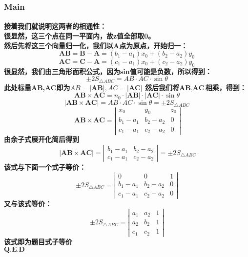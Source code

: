 \documentclass[final,11pt,oneside,UTF8]{article}
\begin{document}
\subsubsection{Main}
\paragraph{
    接着我们就说明这两者的相通性：\\
    很显然，这三个点在同一平面内，故z值全部取0。\\
    然后先将这三个向量归一化，我们以A点为原点，开始归一：\\
    $$\textbf{AB}=\textbf{B}-\textbf{A}=(b_1-a_1)x_0+(b_2-a_2)y_0$$
    $$\textbf{AC}=\textbf{C}-\textbf{A}=(c_1-a_1)x_0+(c_2-a_2)y_0$$
    很显然，我们由三角形面积公式，因为sin值可能是负数，所以得到：\\
    $$\pm 2S_{\triangle ABC}=AB \cdot AC \cdot \sin{\theta}$$
    此处标量AB,AC即为$AB=|\textbf{AB}|,AC=|\textbf{AC}|$
    然后我们将$\textbf{AB},\textbf{AC}$相乘，得到：
    $$\textbf{AB} \times \textbf{AC}
        =n_0 \cdot |\textbf{AB}| \cdot |\textbf{AC}| \cdot \sin{\theta}
    $$
    $$
        |\textbf{AB} \times \textbf{AC}|=AB \cdot AC \cdot \sin{\theta}=\pm 2S_{\triangle ABC}
    $$
    \[
        \ \textbf{AB} \times \textbf{AC}=
        \left|\begin{array}{cccc}
            x_0     & y_0     & z_0 \\
            b_1-a_1 & b_2-a_2 & 0   \\
            c_1-a_1 & c_2-a_2 & 0
        \end{array}\right|
    \]
    由余子式展开化简后得到
    \[
        \ |\textbf{AB} \times \textbf{AC}|=
        \left|\begin{array}{cccc}
            b_1-a_1 & b_2-a_2 \\
            c_1-a_1 & c_2-a_2
        \end{array}\right|=\pm 2S_{\triangle ABC}
    \]
    该式与下面一个式子等价：
    \[
        \pm 2S_{\triangle ABC}=
        \left|\begin{array}{cccc}
            0       & 0       & 1 \\
            b_1-a_1 & b_2-a_2 & 0 \\
            c_1-a_1 & c_2-a_2 & 0
        \end{array}\right|
    \]
    又与该式等价：
    \[
        \pm 2S_{\triangle ABC}=
        \left|\begin{array}{cccc}
            a_1 & a_2 & 1 \\
            a_2 & b_2 & 1 \\
            c_1 & c_2 & 1
        \end{array}\right|
    \]
    该式即为题目式子等价\\
    $\textbf{Q.E.D}$
}
\end{document}
